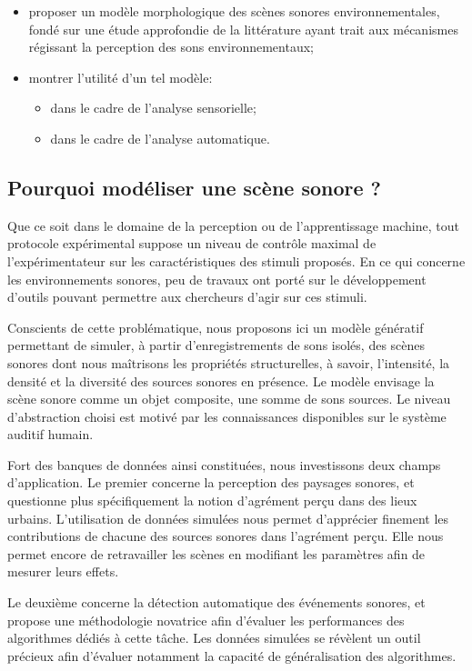 \begin{itemize}
\item proposer un modèle morphologique des scènes sonores environnementales, fondé sur une étude approfondie de la littérature ayant trait aux mécanismes régissant la perception des sons environnementaux;
\item montrer l'utilité d'un tel modèle: 
\begin{itemize}
\item dans le cadre de l'analyse sensorielle;
\item dans le cadre de l'analyse automatique.
\end{itemize} 
\end{itemize}

\subsection{Pourquoi modéliser une scène sonore ?}

Que ce soit dans le domaine de la perception ou de l'apprentissage machine, tout protocole expérimental suppose un niveau de contrôle maximal de l'expérimentateur sur les caractéristiques des stimuli proposés. En ce qui concerne les environnements sonores, peu de travaux ont porté sur le développement d’outils pouvant permettre aux chercheurs d'agir sur ces stimuli.

Conscients de cette problématique, nous proposons ici un modèle génératif permettant de simuler, à partir d'enregistrements de sons isolés, des scènes sonores dont nous maîtrisons les propriétés structurelles, à savoir, l'intensité, la densité et la diversité des sources sonores en présence. Le modèle envisage la scène sonore comme un objet composite, une somme de sons sources. Le niveau d'abstraction choisi est motivé par les connaissances disponibles sur le système auditif humain.

Fort des banques de données ainsi constituées, nous investissons deux champs d'application. Le premier concerne la perception des paysages sonores, et questionne plus spécifiquement la notion d'agrément perçu dans des lieux urbains. L'utilisation de données simulées nous permet d'apprécier finement les contributions de chacune des sources sonores dans l'agrément perçu. Elle nous permet encore de retravailler les scènes en modifiant les paramètres afin de mesurer leurs effets.

Le deuxième concerne la détection automatique des événements sonores, et propose une méthodologie novatrice afin d'évaluer les performances des algorithmes dédiés à cette tâche. Les données simulées se révèlent un outil précieux afin d'évaluer notamment la capacité de généralisation des algorithmes.


